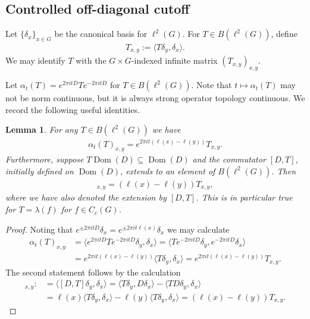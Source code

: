 \documentclass[12pt,a4paper,oneside,final,reqno]{amsart}
\theoremstyle{plain}
\newtheorem{lemma}[theorem]{Lemma}
\theoremstyle{definition}
\begin{document}
\subsection{Controlled off-diagonal cutoff}

Let $\{\delta_x\}_{x\in G}$ be the canonical basis for $\ell^2(G)$. For $T \in B(\ell^2(G))$, define
\begin{align*}
    T_{x,y} := \langle T \delta_y, \delta_x \rangle. 
\end{align*}
We may identify $T$ with the $G\times G$-indexed infinite matrix $(T_{x,y})_{x,y}$. 

Let $\alpha_t(T) = e^{2\pi itD}Te^{-2\pi itD}$ for $T \in B(\ell^2(G))$. Note that $t \mapsto \alpha_t(T)$ may not be norm continuous, but it is always strong operator topology continuous. 
We record the following useful identities. 

\begin{lemma}\label{lemma:matrix-coeff-commutator-identities}
    For any $T \in  B(\ell^2(G))$ we have
    \begin{align*}
         \alpha_t(T)_{x,y} = e^{2\pi it(\ell(x) - \ell(y))} T_{x,y}.
    \end{align*}
    Furthermore, suppose $T\operatorname{Dom}(D)\subseteq\operatorname{Dom}(D)$ and the commutator $[D,T]$, initially defined on $\operatorname{Dom}(D)$, extends to an element of $B(\ell^2(G))$. Then
    \begin{align*}
        [D,T]_{x,y} = (\ell(x) - \ell(y)) T_{x,y},
    \end{align*}
    where we have also denoted the extension by $[D,T]$. This is in particular true for $T = \lambda(f)$ for $f \in C_c(G)$. 
\end{lemma}

\begin{proof}
    Noting that 
    $ e^{\pm 2\pi itD}\delta_x = e^{\pm 2\pi it\ell(x)} \delta_x$ 
    we may calculate
    \begin{align*}
        \alpha_t(T)_{x,y} &= \langle e^{2\pi itD}Te^{-2\pi itD} \delta_y, \delta_x \rangle = \langle T e^{-2\pi itD} \delta_y, e^{-2\pi itD}\delta_x \rangle \\
        &= e^{2\pi it(\ell(x) - \ell(y))} \langle T\delta_y, \delta_x \rangle =  e^{2\pi it(\ell(x) - \ell(y))} T_{x,y}.
    \end{align*}
    The second statement follows by the calculation
    \begin{align*}
        [D,T]_{x,y} :&= \langle [D,T]\delta_y, \delta_x \rangle = \langle T \delta_y , D\delta_x \rangle - \langle TD\delta_y , \delta_x\rangle \\
        &= \ell(x) \langle T \delta_y , \delta_x \rangle - \ell(y) \langle T \delta_y , \delta_x \rangle = (\ell(x) - \ell(y)) T_{x,y}. 
    \end{align*}
    
\end{proof}
\end{document}
